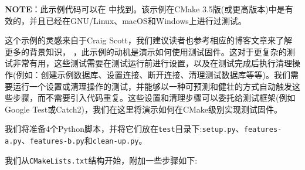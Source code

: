 \begin{myInfoBox}
\textbf{NOTE}：此示例代码可以在  中找到。该示例在CMake 3.5版(或更高版本)中是有效的，并且已经在GNU/Linux、macOS和Windows上进行过测试。
\end{myInfoBox}

这个示例的灵感来自于Craig Scott，我们建议读者也参考相应的博客文章来了解更多的背景知识， ，此示例的动机是演示如何使用测试固件。这对于更复杂的测试非常有用，这些测试需要在测试运行前进行设置，以及在测试完成后执行清理操作(例如：创建示例数据库、设置连接、断开连接、清理测试数据库等等)。我们需要运行一个设置或清理操作的测试，并能够以一种可预测和健壮的方式自动触发这些步骤，而不需要引入代码重复。这些设置和清理步骤可以委托给测试框架(例如Google Test或Catch2)，我们在这里将演示如何在CMake级别实现测试固件。


我们将准备4个Python脚本，并将它们放在\texttt{test}目录下:\texttt{setup.py}、\texttt{features-a.py}、\texttt{features-b.py}和\texttt{clean-up.py}。


我们从\texttt{CMakeLists.txt}结构开始，附加一些步骤如下:

